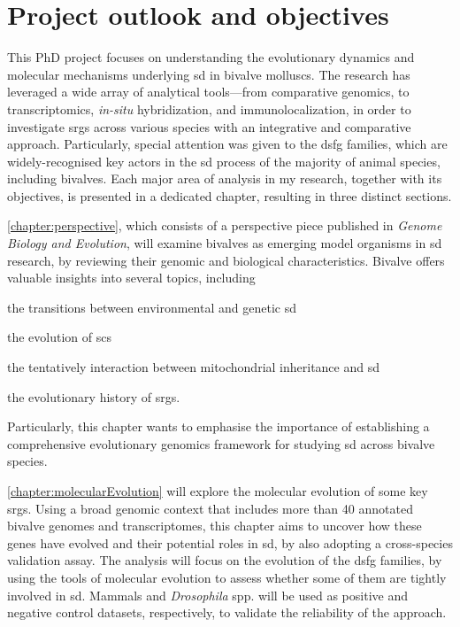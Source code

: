 
% 

{
\chapter{Project outlook and objectives}
\label{chapter:outlookObjectives}
}

This PhD project focuses on understanding the evolutionary dynamics and molecular mechanisms underlying \gls{sd} in bivalve molluscs. The research has leveraged a wide array of analytical tools—from comparative genomics, to transcriptomics, \textit{in-situ} hybridization, and immunolocalization, in order to investigate \glspl{srg} across various species with an integrative and comparative approach. Particularly, special attention was given to the \gls{dsfg} families, which are widely-recognised key actors in the \gls{sd} process of the majority of animal species, including bivalves. Each major area of analysis in my research, together with its objectives, is presented in a dedicated chapter, resulting in three distinct sections.

\cref{chapter:perspective}, which consists of a perspective piece published in \textit{Genome Biology and Evolution}, will examine bivalves as emerging model organisms in \gls{sd} research, by reviewing their genomic and biological characteristics. Bivalve offers valuable insights into several topics, including
\begin{inlinelist}[itemjoin={{, }}, itemjoin*={{, and }}]
    \item the transitions between environmental and genetic \gls{sd}
    \item the evolution of \glspl{sc}
    \item the tentatively interaction between mitochondrial inheritance and \gls{sd}
    \item the evolutionary history of \glspl{srg}.
\end{inlinelist}    
Particularly, this chapter wants to emphasise the importance of establishing a comprehensive evolutionary genomics framework for studying \gls{sd} across bivalve species.

\cref{chapter:molecularEvolution} will explore the molecular evolution of some key \glspl{srg}. Using a broad genomic context that includes more than 40 annotated bivalve genomes and transcriptomes, this chapter aims to uncover how these genes have evolved and their potential roles in \gls{sd}, by also adopting a cross-species validation assay. The analysis will focus on the evolution of the \gls{dsfg} families, by using the tools of molecular evolution to assess whether some of them are tightly involved in \gls{sd}. Mammals and \textit{Drosophila} spp. will be used as positive and negative control datasets, respectively, to validate the reliability of the approach.

